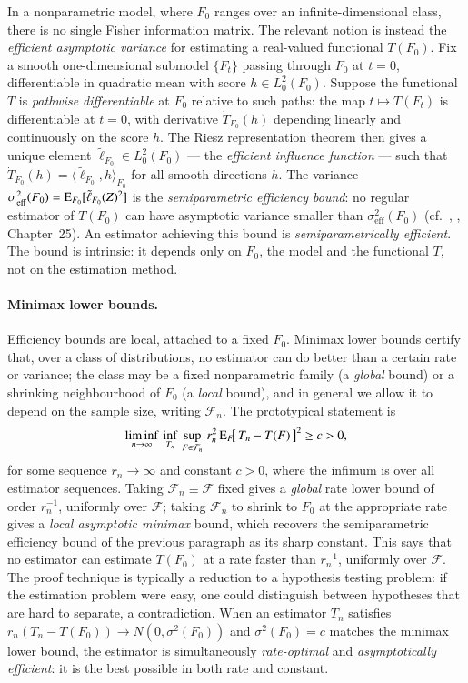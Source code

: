 In a nonparametric model, where $F_0$ ranges over an infinite-dimensional class, there is no single Fisher information matrix. The relevant notion is instead the \textit{efficient asymptotic variance} for estimating a real-valued functional $T(F_0)$. Fix a smooth one-dimensional submodel $\{F_t\}$ passing through $F_0$ at $t=0$, differentiable in quadratic mean with score $h \in L^2_0(F_0)$. Suppose the functional $T$ is \textit{pathwise differentiable} at $F_0$ relative to such paths: the map $t \mapsto T(F_t)$ is differentiable at $t=0$, with derivative $\dot{T}_{F_0}(h)$ depending linearly and continuously on the score $h$. The Riesz representation theorem then gives a unique element $\tilde{\ell}_{F_0} \in L^2_0(F_0)$ --- the \textit{efficient influence function} --- such that $\dot{T}_{F_0}(h) = \langle \tilde{\ell}_{F_0}, h\rangle_{F_0}$ for all smooth directions $h$. The variance $\sigma^2_{\mathrm{eff}}(F_0) = \mathrm{E}_{F_0}[\tilde{\ell}_{F_0}(Z)^2]$ is the \textit{semiparametric efficiency bound}: no regular estimator of $T(F_0)$ can have asymptotic variance smaller than $\sigma^2_{\mathrm{eff}}(F_0)$ (cf.\ \cite{13}, \cite{6}, Chapter~25). An estimator achieving this bound is \textit{semiparametrically efficient}. The bound is intrinsic: it depends only on $F_0$, the model and the functional $T$, not on the estimation method.

\paragraph{Minimax lower bounds.}
Efficiency bounds are local, attached to a fixed $F_0$. Minimax lower bounds certify that, over a class of distributions, no estimator can do better than a certain rate or variance; the class may be a fixed nonparametric family (a \textit{global} bound) or a shrinking neighbourhood of $F_0$ (a \textit{local} bound), and in general we allow it to depend on the sample size, writing $\mathcal{F}_n$. The prototypical statement is
\[
\liminf_{n\to\infty} \, \inf_{T_n} \, \sup_{F \in \mathcal{F}_n} \, r_n^2 \, \mathrm{E}_{F}\!\big[\,T_n - T(F)\,\big]^2 \geq c > 0,
\]
for some sequence $r_n \to \infty$ and constant $c > 0$, where the infimum is over all estimator sequences. Taking $\mathcal{F}_n \equiv \mathcal{F}$ fixed gives a \textit{global} rate lower bound of order $r_n^{-1}$, uniformly over $\mathcal{F}$; taking $\mathcal{F}_n$ to shrink to $F_0$ at the appropriate rate gives a \textit{local asymptotic minimax} bound, which recovers the semiparametric efficiency bound of the previous paragraph as its sharp constant. This says that no estimator can estimate $T(F_0)$ at a rate faster than $r_n^{-1}$, uniformly over $\mathcal{F}$. The proof technique is typically a reduction to a hypothesis testing problem: if the estimation problem were easy, one could distinguish between hypotheses that are hard to separate, a contradiction. When an estimator $T_n$ satisfies $r_n(T_n - T(F_0)) \to N(0, \sigma^2(F_0))$ and $\sigma^2(F_0) = c$ matches the minimax lower bound, the estimator is simultaneously \textit{rate-optimal} and \textit{asymptotically efficient}: it is the best possible in both rate and constant.

